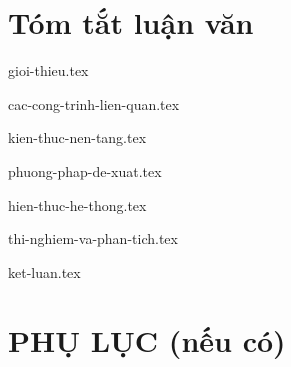 \documentclass[a4paper, 12pt]{article}
\theoremstyle{definition}
\begin{document}
\section*{Tóm tắt luận văn}


\pagebreak
\tableofcontents

\thispagestyle{empty}
\pagebreak
\listoffigures
\pagebreak
\listoftables

\pagebreak
{gioi-thieu.tex}
\pagebreak

{cac-cong-trinh-lien-quan.tex}
\pagebreak

{kien-thuc-nen-tang.tex}
\pagebreak

{phuong-phap-de-xuat.tex}
\pagebreak

{hien-thuc-he-thong.tex}
\pagebreak

{thi-nghiem-va-phan-tich.tex}
\pagebreak

{ket-luan.tex}
\pagebreak

\printbibliography[title={Tài liệu tham khảo}]
\pagebreak

\section*{PHỤ LỤC (nếu có)}
\end{document}
